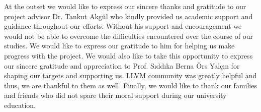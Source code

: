 \vspace*{-6pt}
At the outset we would like to express our sincere thanks and gratitude to our project advisor Dr. Tankut Akgül who kindly provided us  academic support and guidance throughout our efforts. Without his support and encouragement we would not be able to overcome the difficulties encountered over the course of our studies.  We would like to express our gratitude to him for helping us make progress with the project. We would also like to take this opportunity to express our sincere gratitude and appreciation to Prof. Sıddıka Berna Örs Yalçın for shaping our targets and supporting us. LLVM community was greatly helpful and thus, we are thankful to them as well. Finally, we would like to thank our families and friends who did not spare their moral support during our university education.




